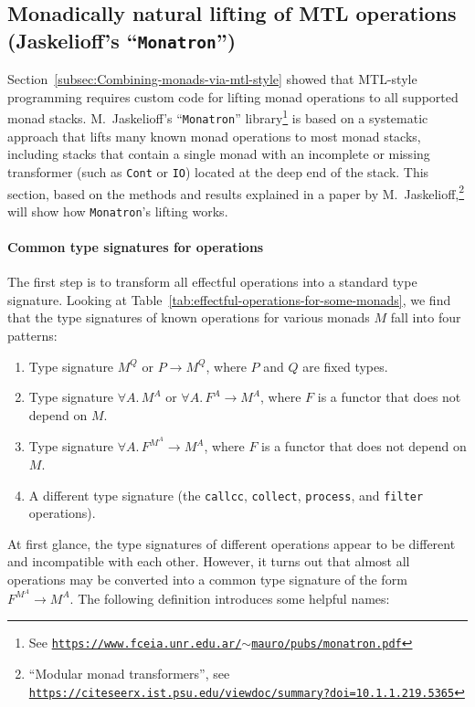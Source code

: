 \subsection{Monadically natural lifting of MTL operations (Jaskelioff\textsf{'}s \textsf{``}\texttt{Monatron}\textsf{''})}

Section~\ref{subsec:Combining-monads-via-mtl-style} showed that
MTL-style programming requires custom code for lifting monad operations
to all supported monad stacks. M.~Jaskelioff\textsf{'}s
\textsf{``}\texttt{Monatron}\textsf{''} library\footnote{See \texttt{\href{https://www.fceia.unr.edu.ar/~mauro/pubs/monatron.pdf}{https://www.fceia.unr.edu.ar/$\sim$mauro/pubs/monatron.pdf}}}
is based on a systematic approach that lifts many known monad operations
to most monad stacks, including stacks that contain a single monad
with an incomplete or missing transformer (such as \lstinline!Cont!
or \lstinline!IO!) located at the deep end of the stack. This section,
based on the methods and results explained in a paper by M.~Jaskelioff,\footnote{\textsf{``}Modular monad transformers\textsf{''}, see \texttt{\href{https://citeseerx.ist.psu.edu/viewdoc/summary?doi=10.1.1.219.5365}{https://citeseerx.ist.psu.edu/viewdoc/summary?doi=10.1.1.219.5365}}}
will show how \texttt{Monatron}\textsf{'}s lifting works. 

\paragraph{Common type signatures for operations}

The first step is to transform all effectful operations into a standard
type signature. Looking at Table~\ref{tab:effectful-operations-for-some-monads},
we find that the type signatures of known operations for various monads
$M$ fall into four patterns: 
\begin{enumerate}
\item Type signature $M^{Q}$ or $P\rightarrow M^{Q}$, where $P$ and $Q$
are fixed types.
\item Type signature $\forall A.\,M^{A}$ or $\forall A.\,F^{A}\rightarrow M^{A}$,
where $F$ is a functor that does not depend on $M$.
\item Type signature $\forall A.\,F^{M^{A}}\rightarrow M^{A}$, where $F$
is a functor that does not depend on $M$.
\item A different type signature (the \lstinline!callcc!, \lstinline!collect!,
\lstinline!process!, and \lstinline!filter! operations).
\end{enumerate}
At first glance, the type signatures of different operations appear
to be different and incompatible with each other. However, it turns
out that almost all operations may be converted into a common type
signature of the form $F^{M^{A}}\rightarrow M^{A}$. The following
definition introduces some helpful names:

